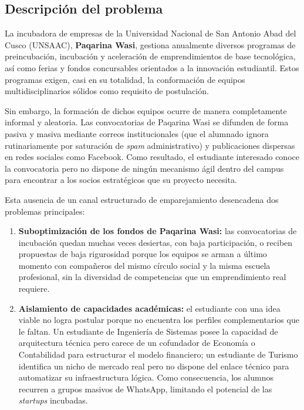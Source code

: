 \documentclass[12pt,a4paper]{article}
\begin{document}
\subsection{Descripción del problema}
La incubadora de empresas de la Universidad Nacional de San Antonio Abad del Cusco (UNSAAC), \textbf{Paqarina Wasi}, gestiona anualmente diversos programas de preincubación, incubación y aceleración de emprendimientos de base tecnológica, así como ferias y fondos concursables orientados a la innovación estudiantil. Estos programas exigen, casi en su totalidad, la conformación de equipos multidisciplinarios sólidos como requisito de postulación.

Sin embargo, la formación de dichos equipos ocurre de manera completamente informal y aleatoria. Las convocatorias de Paqarina Wasi se difunden de forma pasiva y masiva mediante correos institucionales (que el alumnado ignora rutinariamente por saturación de \emph{spam} administrativo) y publicaciones dispersas en redes sociales como Facebook. Como resultado, el estudiante interesado conoce la convocatoria pero no dispone de ningún mecanismo ágil dentro del campus para encontrar a los socios estratégicos que su proyecto necesita.

Esta ausencia de un canal estructurado de emparejamiento desencadena dos problemas principales:
\begin{enumerate}
    \item \textbf{Suboptimización de los fondos de Paqarina Wasi:} las convocatorias de incubación quedan muchas veces desiertas, con baja participación, o reciben propuestas de baja rigurosidad porque los equipos se arman a último momento con compañeros del mismo círculo social y la misma escuela profesional, sin la diversidad de competencias que un emprendimiento real requiere.
    \item \textbf{Aislamiento de capacidades académicas:} el estudiante con una idea viable no logra postular porque no encuentra los perfiles complementarios que le faltan. Un estudiante de Ingeniería de Sistemas posee la capacidad de arquitectura técnica pero carece de un cofundador de Economía o Contabilidad para estructurar el modelo financiero; un estudiante de Turismo identifica un nicho de mercado real pero no dispone del enlace técnico para automatizar su infraestructura lógica. Como consecuencia, los alumnos recurren a grupos masivos de WhatsApp, limitando el potencial de las \emph{startups} incubadas.
\end{enumerate}
\end{document}
